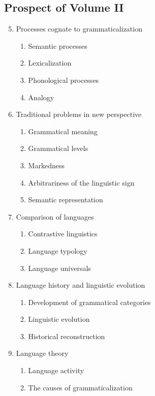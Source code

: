 \begin{refsection}
\chapter[Prospect of Volume II]{Prospect of Volume II\textsuperscript{\footnotemark}}


\renewcommand{\labelenumii}{\arabic{enumi}.\arabic{enumii}.}
\begin{enumerate}
\setcounter{enumi}{4}
\item Processes cognate to grammaticalization
	\begin{enumerate} \parskip0pt
	\item Semantic processes
	\item Lexicalization
	\item Phonological processes
	\item Analogy
	\end{enumerate}
\item Traditional problems in new perspective
	\begin{enumerate} \parskip0pt
	\item Grammatical meaning
	\item Grammatical levels
	\item Markedness
	\item Arbitrariness of the linguistic sign
	\item Semantic representation
	\end{enumerate} \parskip0pt
\item Comparison of languages
	\begin{enumerate} \parskip0pt
	\item Contrastive linguistics
	\item Language typology
	\item Language universals
	\end{enumerate}
\item Language history and linguistic evolution
	\begin{enumerate} \parskip0pt
	\item Development of grammatical categories
	\item Linguistic evolution
	\item Historical reconstruction
	\end{enumerate}
\item Language theory
	\begin{enumerate} \parskip0pt
	\item Language activity
	\item The causes of grammaticalization
	\end{enumerate}
\end{enumerate}

\end{refsection}